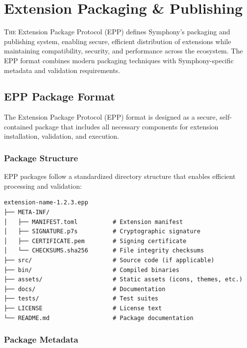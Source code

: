
\section{Extension Packaging \& Publishing}
\label{sec:extension-packaging-publishing}

\lettrine{T}{he} Extension Package Protocol (EPP) defines Symphony's packaging and publishing system, enabling secure, efficient distribution of extensions while maintaining compatibility, security, and performance across the ecosystem. The EPP format combines modern packaging techniques with Symphony-specific metadata and validation requirements.

\subsection{EPP Package Format}
\label{subsec:epp-package-format}

The Extension Package Protocol (EPP) format is designed as a secure, self-contained package that includes all necessary components for extension installation, validation, and execution.

\subsubsection{Package Structure}
\label{subsubsec:package-structure}

EPP packages follow a standardized directory structure that enables efficient processing and validation:

\begin{lstlisting}[caption=EPP Package Structure]
extension-name-1.2.3.epp
├── META-INF/
│   ├── MANIFEST.toml          # Extension manifest
│   ├── SIGNATURE.p7s          # Cryptographic signature
│   ├── CERTIFICATE.pem        # Signing certificate
│   └── CHECKSUMS.sha256       # File integrity checksums
├── src/                       # Source code (if applicable)
├── bin/                       # Compiled binaries
├── assets/                    # Static assets (icons, themes, etc.)
├── docs/                      # Documentation
├── tests/                     # Test suites
├── LICENSE                    # License text
└── README.md                  # Package documentation
\end{lstlisting}

\subsubsection{Package Metadata}
\label{subsubsec:package-metadata}

